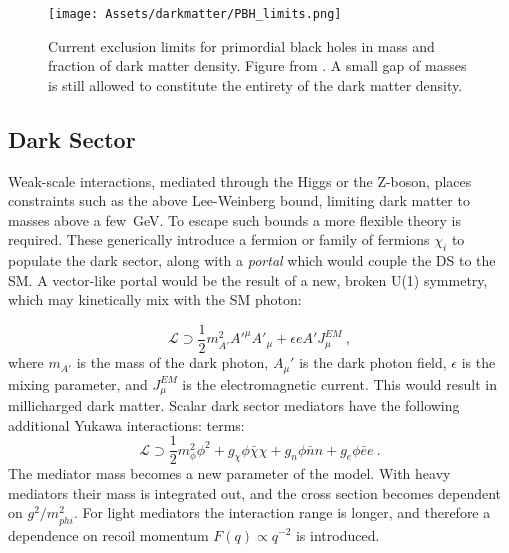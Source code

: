 \begin{figure}
    \centering
    \texttt{[image: Assets/darkmatter/PBH\_limits.png]}
    \caption[Current exclusion limits for primordial black holes in mass and fraction of dark matter density.]
    {Current exclusion limits for primordial black holes in mass and fraction of dark matter density.
    Figure from \cite{villanueva-domingo_21_2021}.
    A small gap of masses is still allowed to constitute the entirety of the dark matter density.
    }
    \label{fig:my_label}
\end{figure}

\subsection{Dark Sector}

Weak-scale interactions, mediated through the Higgs or the Z-boson, places constraints such as the above Lee-Weinberg bound, limiting dark matter to masses above a few~GeV.
To escape such bounds a more flexible theory is required.
These generically introduce a fermion or family of fermions  $\chi_i$ to populate the dark sector, along with a \textit{portal} which would couple the DS to the SM.
A vector-like portal would be the result of a new, broken U(1) symmetry, which may kinetically mix with the SM photon:

\begin{equation}
    \mathcal{L} \supset \frac{1}{2} m^2_{A'} A'^\mu A'_\mu + \epsilon e A' J_\mu^{EM}~,
\end{equation}
\noindent
where $m_{A'}$ is the mass of the dark photon, $A_\mu'$ is the dark photon field, $\epsilon$ is the mixing parameter, and $J_\mu^{EM}$ is the electromagnetic current.
This would result in millicharged dark matter\cite{berlin_dark_2019}.
Scalar dark sector mediators have the following additional Yukawa interactions: terms\cite{coskuner_direct_2019, essig_dark_2013}:
\begin{equation}
    \mathcal{L} \supset \frac{1}{2} m_\phi^2 \phi^2 + g_\chi \phi \bar \chi \chi + g_n \phi \bar n n + g_e \phi \bar e e~.
\end{equation}
\noindent
The mediator mass becomes a new parameter of the model.
With heavy mediators their mass is integrated out, and the cross section becomes dependent on $g^2/m_{phi}^2$.
For light mediators the interaction range is longer, and therefore a dependence on recoil momentum $F(q) \propto q^{-2}$ is introduced.

